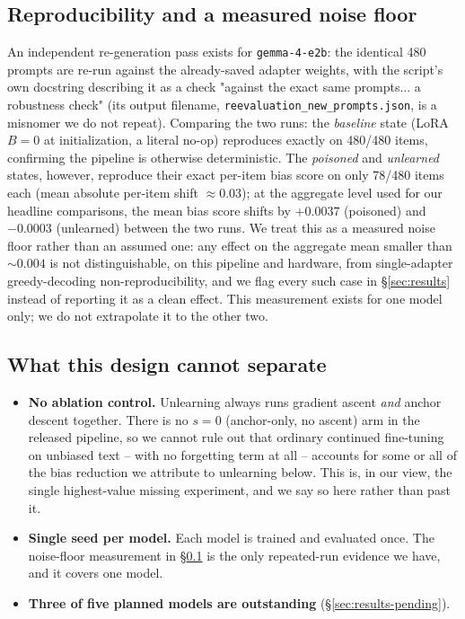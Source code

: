\documentclass[runningheads]{llncs}
\begin{document}
\subsection{Reproducibility and a measured noise floor}
\label{sec:noisefloor}
An independent re-generation pass exists for \texttt{gemma-4-e2b}: the identical 480 prompts are re-run against the already-saved adapter weights, with the script's own docstring describing it as a check "against the exact same prompts... a robustness check" (its output filename, \texttt{reevaluation\_\allowbreak new\_\allowbreak prompts.json}, is a misnomer we do not repeat). Comparing the two runs: the \emph{baseline} state (LoRA $B{=}0$ at initialization, a literal no-op) reproduces exactly on 480/480 items, confirming the pipeline is otherwise deterministic. The \emph{poisoned} and \emph{unlearned} states, however, reproduce their exact per-item bias score on only 78/480 items each (mean absolute per-item shift $\approx 0.03$); at the aggregate level used for our headline comparisons, the mean bias score shifts by $+0.0037$ (poisoned) and $-0.0003$ (unlearned) between the two runs. We treat this as a measured noise floor rather than an assumed one: any effect on the aggregate mean smaller than $\sim\!0.004$ is not distinguishable, on this pipeline and hardware, from single-adapter greedy-decoding non-reproducibility, and we flag every such case in \S\ref{sec:results} instead of reporting it as a clean effect. This measurement exists for one model only; we do not extrapolate it to the other two.

\subsection{What this design cannot separate}
\label{sec:design-limits}
\begin{itemize}
\item \textbf{No ablation control.} Unlearning always runs gradient ascent \emph{and} anchor descent together. There is no $s{=}0$ (anchor-only, no ascent) arm in the released pipeline, so we cannot rule out that ordinary continued fine-tuning on unbiased text -- with no forgetting term at all -- accounts for some or all of the bias reduction we attribute to unlearning below. This is, in our view, the single highest-value missing experiment, and we say so here rather than past it.
\item \textbf{Single seed per model.} Each model is trained and evaluated once. The noise-floor measurement in \S\ref{sec:noisefloor} is the only repeated-run evidence we have, and it covers one model.
\item \textbf{Three of five planned models are outstanding} (\S\ref{sec:results-pending}).
\end{itemize}
\end{document}
